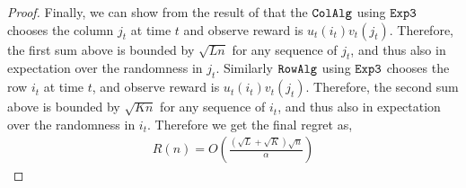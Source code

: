 \begin{proof}

Finally, we can show from the result of \citet{auer2002nonstochastic} that the ${\tt ColAlg}$ using ${\tt Exp3}$ chooses the column $j_t$ at time $t$ and observe reward is $u_t(i_t) v_t(j_t)$. Therefore, the first sum above is bounded by $\sqrt{L n}$ for any sequence of $j_t$, and thus also in expectation over the randomness in $j_t$. Similarly ${\tt RowAlg}$ using ${\tt Exp3}$ chooses the row $i_t$ at time $t$, and observe reward is $u_t(i_t) v_t(j_t)$. Therefore, the second sum above is bounded by $\sqrt{K n}$ for any sequence of $i_t$, and thus also in expectation over the randomness in $i_t$. Therefore we get the final regret as,
\begin{align*}
  R(n) = O\left(\frac{\left(\sqrt{L } + \sqrt{K }\right)\sqrt{n}}{\alpha}\right)
\end{align*}
\end{proof}





